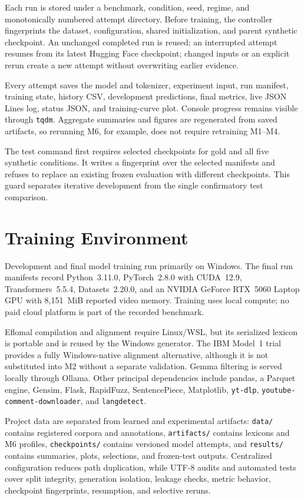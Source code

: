 \documentclass[12pt, a4paper, twoside, openany]{report}
\begin{document}
Each run is stored under a benchmark, condition, seed, regime, and monotonically numbered attempt directory. Before training, the controller fingerprints the dataset, configuration, shared initialization, and parent synthetic checkpoint. An unchanged completed run is reused; an interrupted attempt resumes from its latest Hugging Face checkpoint; changed inputs or an explicit rerun create a new attempt without overwriting earlier evidence.

Every attempt saves the model and tokenizer, experiment input, run manifest, training state, history CSV, development predictions, final metrics, live JSON Lines log, status JSON, and training-curve plot. Console progress remains visible through \texttt{tqdm}. Aggregate summaries and figures are regenerated from saved artifacts, so rerunning M6, for example, does not require retraining M1--M4.

The test command first requires selected checkpoints for gold and all five synthetic conditions. It writes a fingerprint over the selected manifests and refuses to replace an existing frozen evaluation with different checkpoints. This guard separates iterative development from the single confirmatory test comparison.


\section{Training Environment}

Development and final model training run primarily on Windows. The final run manifests record Python~3.11.0, PyTorch~2.8.0 with CUDA~12.9, Transformers~5.5.4, Datasets~2.20.0, and an NVIDIA GeForce RTX~5060 Laptop GPU with 8,151~MiB reported video memory. Training uses local compute; no paid cloud platform is part of the recorded benchmark.

Eflomal compilation and alignment require Linux/WSL, but its serialized lexicon is portable and is reused by the Windows generator. The IBM Model~1 trial provides a fully Windows-native alignment alternative, although it is not substituted into M2 without a separate validation. Gemma filtering is served locally through Ollama. Other principal dependencies include pandas, a Parquet engine, Gensim, Flask, RapidFuzz, SentencePiece, Matplotlib, \texttt{yt-dlp}, \texttt{youtube-comment-downloader}, and \texttt{langdetect}.

Project data are separated from learned and experimental artifacts: \texttt{data/} contains registered corpora and annotations, \texttt{artifacts/} contains lexicons and M6 profiles, \texttt{checkpoints/} contains versioned model attempts, and \texttt{results/} contains summaries, plots, selections, and frozen-test outputs. Centralized configuration reduces path duplication, while UTF-8 audits and automated tests cover split integrity, generation isolation, leakage checks, metric behavior, checkpoint fingerprints, resumption, and selective reruns.
\end{document}
